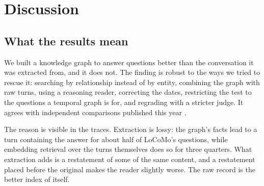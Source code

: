 \documentclass[11pt,letterpaper]{article}
\begin{document}
\begin{table}[h]
\centering
\small
{}
\caption{What did the notes say at an earlier moment? Sixty scenario runs; nothing was changed after this run.}
\label{tab:asof}
\end{table}

\section{Discussion}
\label{sec:discussion}

\subsection{What the results mean}

We built a knowledge graph to answer questions better than the conversation it was extracted from, and it does not. The finding is robust to the ways we tried to rescue it: searching by relationship instead of by entity, combining the graph with raw turns, using a reasoning reader, correcting the dates, restricting the test to the questions a temporal graph is for, and regrading with a stricter judge. It agrees with independent comparisons published this year \citep{bao2026naiverag, zhou2026explicit}.

The reason is visible in the traces. Extraction is lossy: the graph's facts lead to a turn containing the answer for about half of LoCoMo's questions, while embedding retrieval over the turns themselves does so for three quarters. What extraction adds is a restatement of some of the same content, and a restatement placed before the original makes the reader slightly worse. The raw record is the better index of itself.
\end{document}
